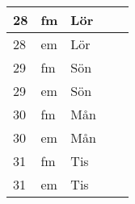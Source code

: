 \documentclass[a4paper]{article}
\begin{document}
\begin{table}[ht!]
\begin{tabular}{lllp{7cm}p{7cm}}
\multicolumn{1}{|l|}{28} & \multicolumn{1}{l|}{fm} & \multicolumn{1}{l|}{Lör} & \multicolumn{1}{l|}{} & \multicolumn{1}{l|}{} \\ \hline
\multicolumn{1}{|l|}{28} & \multicolumn{1}{l|}{em} & \multicolumn{1}{l|}{Lör} & \multicolumn{1}{l|}{} & \multicolumn{1}{l|}{} \\ \hline    

\multicolumn{1}{|l|}{29} & \multicolumn{1}{l|}{fm} & \multicolumn{1}{l|}{Sön} & \multicolumn{1}{l|}{} & \multicolumn{1}{l|}{} \\ \hline
\multicolumn{1}{|l|}{29} & \multicolumn{1}{l|}{em} & \multicolumn{1}{l|}{Sön} & \multicolumn{1}{l|}{} & \multicolumn{1}{l|}{} \\ \hline    

\multicolumn{1}{|l|}{30} & \multicolumn{1}{l|}{fm} & \multicolumn{1}{l|}{Mån} & \multicolumn{1}{l|}{} & \multicolumn{1}{l|}{} \\ \hline
\multicolumn{1}{|l|}{30} & \multicolumn{1}{l|}{em} & \multicolumn{1}{l|}{Mån} & \multicolumn{1}{l|}{} & \multicolumn{1}{l|}{} \\ \hline    

\multicolumn{1}{|l|}{31} & \multicolumn{1}{l|}{fm} & \multicolumn{1}{l|}{Tis} & \multicolumn{1}{l|}{} & \multicolumn{1}{l|}{} \\ \hline
\multicolumn{1}{|l|}{31} & \multicolumn{1}{l|}{em} & \multicolumn{1}{l|}{Tis} & \multicolumn{1}{l|}{} & \multicolumn{1}{l|}{} \\ \hline    

    \end{tabular}
    \end{table}
    
\end{document}
